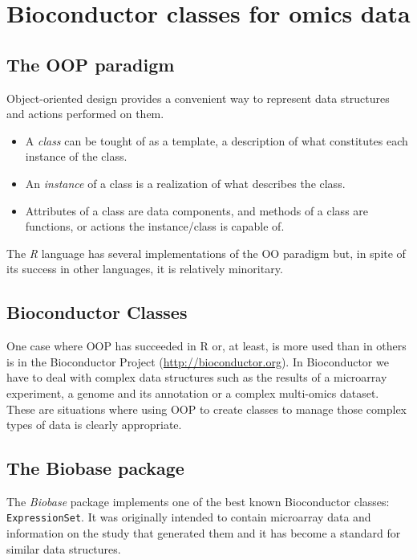 \documentclass[a4paper]{article}\usepackage[]{graphicx}\usepackage[]{color}
\newcommand{\Rpackage}[1]{{\textit{#1}}}
\begin{document}
\section{Bioconductor classes for omics data}

\subsection{The OOP paradigm}

Object-oriented design provides a convenient way to represent data structures and actions performed on them.
\begin{itemize}
  \item A \emph{class} can be tought of as a template, a description of what constitutes each instance of the class.
  \item An \emph{instance} of a class is a realization of what describes the class.
  \item Attributes of a class are data components, and methods of a class are functions, or actions the instance/class is capable of.
\end{itemize}

The {\it R} language has several implementations of the OO paradigm but, in spite of its success in other languages, it is relatively minoritary.


\subsection{Bioconductor Classes}

One case where OOP has succeeded in R or, at least, is more used than in others is in the Bioconductor Project (\url{http://bioconductor.org}). In Bioconductor we have to deal with complex data structures such as the results of a microarray experiment, a genome and its annotation or a complex multi-omics dataset. These are situations where using OOP to create classes to manage those complex types of data is clearly appropriate.

\subsection{The Biobase package}

The \Rpackage{Biobase} package implements one of the best known Bioconductor classes: \texttt{ExpressionSet}. It was originally intended to contain microarray data and information on the study that generated them and it has become a standard for similar data structures.
\end{document}
